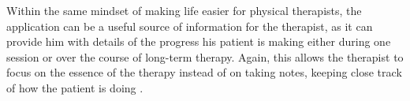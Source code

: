 Within the same mindset of making life easier for physical therapists, the application can be a useful source of information for the therapist, as it can provide him with details of the progress his patient is making either during one session or over the course of long-term therapy. Again, this allows the therapist to focus on the essence of the therapy instead of on taking notes, keeping close track of how the patient is doing \cite{Annema2013}.\\